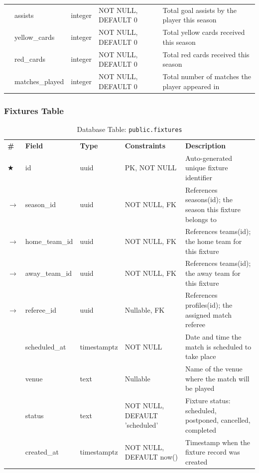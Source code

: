 \documentclass[12pt,a4paper]{report}
\begin{document}
\begin{longtable}{p{0.4cm}p{3.5cm}p{2.3cm}p{3.0cm}p{4.5cm}}
\rowcolor[HTML]{EEF2FF}
 & assists & integer & NOT NULL, DEFAULT 0 & Total goal assists by the player this season \\
\rowcolor[HTML]{FFFFFF}
 & yellow\_cards & integer & NOT NULL, DEFAULT 0 & Total yellow cards received this season \\
\rowcolor[HTML]{EEF2FF}
 & red\_cards & integer & NOT NULL, DEFAULT 0 & Total red cards received this season \\
\rowcolor[HTML]{FFFFFF}
 & matches\_played & integer & NOT NULL, DEFAULT 0 & Total number of matches the player appeared in \\
\end{longtable}

\subsubsection{Fixtures Table}
\begin{table}[htbp]
\centering
\caption{Database Table: \texttt{public.fixtures}}
\setlength{\tabcolsep}{4pt}
\begin{tabular}{p{0.4cm}p{3.5cm}p{2.3cm}p{3.0cm}p{4.5cm}}
\rowcolor[HTML]{003087}
{\color{white}\textbf{\#}} &
{\color{white}\textbf{Field}} &
{\color{white}\textbf{Type}} &
{\color{white}\textbf{Constraints}} &
{\color{white}\textbf{Description}} \\
\rowcolor[HTML]{EEF2FF}
$\bigstar$ & id & uuid & PK, NOT NULL & Auto-generated unique fixture identifier \\
\rowcolor[HTML]{FFFFFF}
$\to$ & season\_id & uuid & NOT NULL, FK & References seasons(id); the season this fixture belongs to \\
\rowcolor[HTML]{EEF2FF}
$\to$ & home\_team\_id & uuid & NOT NULL, FK & References teams(id); the home team for this fixture \\
\rowcolor[HTML]{FFFFFF}
$\to$ & away\_team\_id & uuid & NOT NULL, FK & References teams(id); the away team for this fixture \\
\rowcolor[HTML]{EEF2FF}
$\to$ & referee\_id & uuid & Nullable, FK & References profiles(id); the assigned match referee \\
\rowcolor[HTML]{FFFFFF}
 & scheduled\_at & timestamptz & NOT NULL & Date and time the match is scheduled to take place \\
\rowcolor[HTML]{EEF2FF}
 & venue & text & Nullable & Name of the venue where the match will be played \\
\rowcolor[HTML]{FFFFFF}
 & status & text & NOT NULL, DEFAULT 'scheduled' & Fixture status: scheduled, postponed, cancelled, completed \\
\rowcolor[HTML]{EEF2FF}
 & created\_at & timestamptz & NOT NULL, DEFAULT now() & Timestamp when the fixture record was created \\
\end{tabular}
\end{table}
\end{document}
